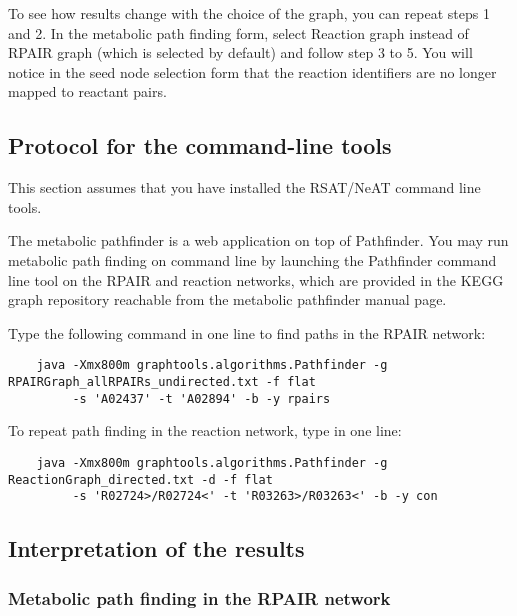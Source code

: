 To see how results change with the choice of the graph, you can repeat steps 1 and 2.
In the metabolic path finding form, select Reaction graph instead of RPAIR graph (which is selected by default) and
follow step 3 to 5. You will notice in the seed node selection form that the reaction identifiers are no longer mapped to
reactant pairs.

\subsection{Protocol for the command-line tools}

This section assumes that you have installed the RSAT/NeAT command line tools.

The metabolic pathfinder is a web application on top of Pathfinder.
You may run metabolic path finding on command line by launching the Pathfinder command line tool on
the RPAIR and reaction networks, which are provided in the KEGG graph repository reachable from the metabolic
pathfinder manual page.

Type the following command in one line to find paths in the RPAIR network:
	{\color{Blue} \begin{footnotesize}
		\begin{verbatim}
	java -Xmx800m graphtools.algorithms.Pathfinder -g RPAIRGraph_allRPAIRs_undirected.txt -f flat
	     -s 'A02437' -t 'A02894' -b -y rpairs
	\end{verbatim} \end{footnotesize}
	}

To repeat path finding in the reaction network, type in one line:

{\color{Blue} \begin{footnotesize}
		\begin{verbatim}
	java -Xmx800m graphtools.algorithms.Pathfinder -g ReactionGraph_directed.txt -d -f flat
	     -s 'R02724>/R02724<' -t 'R03263>/R03263<' -b -y con
	\end{verbatim} \end{footnotesize}
	}

\subsection{Interpretation of the results}

\subsubsection{Metabolic path finding in the RPAIR network}

